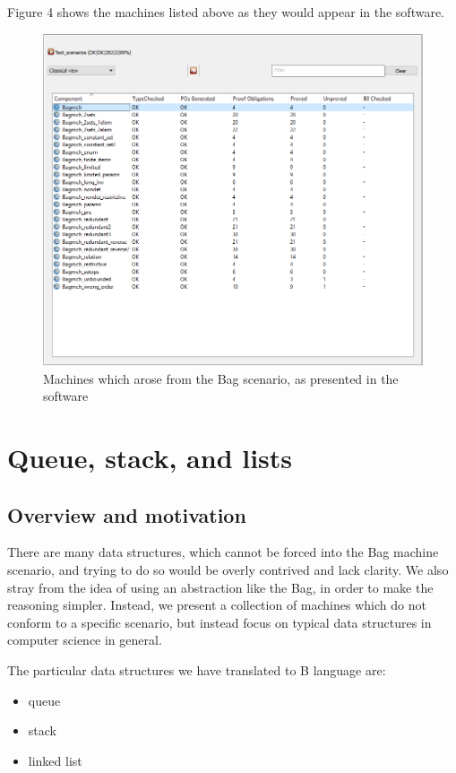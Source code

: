 \documentclass[12pt,journal,duplex]{IEEEtran}
\begin{document}
	Figure 4 shows the machines listed above as they would appear in the software.
\begin{figure}
	\centering
	\includegraphics[scale=0.8]{bagmchs.png}
	\caption{Machines which arose from the Bag scenario, as presented in the software}
\end{figure}


	\section{Queue, stack, and lists}
	\subsection{Overview and motivation}
	There are many data structures, which cannot be forced into the Bag machine scenario, and trying to do so would be overly contrived and lack clarity. We also stray from the idea of using an abstraction like the Bag, in order to make the reasoning simpler. Instead, we present a collection of machines which do not conform to a specific scenario, but instead focus on typical data structures in computer science in general.

	The particular data structures we have translated to B language are:
	\begin{itemize}
		\item queue
		\item stack
		\item linked list
	\end{itemize}
\end{document}
